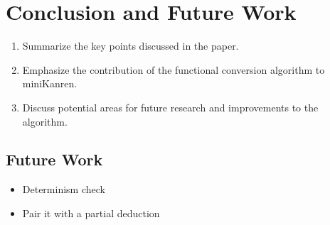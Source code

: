 \section{Conclusion and Future Work}

\begin{enumerate}
    \item Summarize the key points discussed in the paper.
    \item Emphasize the contribution of the functional conversion algorithm to miniKanren.
    \item Discuss potential areas for future research and improvements to the algorithm.
\end{enumerate}

\subsection{Future Work}

\begin{itemize}
    \item Determinism check
    \item Pair it with a partial deduction
\end{itemize}